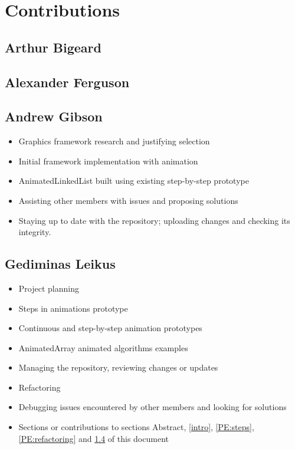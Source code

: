\documentclass{l3proj}
\begin{document}
\section{Contributions}
\subsection{Arthur Bigeard}
\subsection{Alexander Ferguson}
\subsection{Andrew Gibson}
\begin{itemize}
	\item Graphics framework research and justifying selection
	\item Initial framework implementation with animation
	\item AnimatedLinkedList built using existing step-by-step prototype
	\item Assisting other members with issues and proposing solutions
	\item Staying up to date with the repository; uploading changes
and checking its integrity.
\end{itemize}
\subsection{Gediminas Leikus}
\label{Gediminas:Con}
\begin{itemize}
	\item Project planning
	\item Steps in animations prototype
	\item Continuous and step-by-step animation prototypes
	\item AnimatedArray animated algorithms examples
	\item Managing the repository, reviewing changes or updates
	\item Refactoring
	\item Debugging issues encountered by other members and looking for solutions
	\item Sections or contributions to sections Abstract, \ref{intro}, \ref{PE:steps}, \ref{PE:refactoring} and \ref{Gediminas:Con} of this document
\end{itemize}
\end{document}
